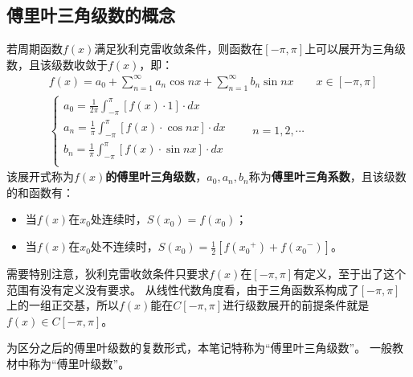 \subsection{傅里叶三角级数的概念}

\begin{definition}[傅里叶三角级数]
若周期函数$f\left( x \right) $满足狄利克雷收敛条件，则函数在$\left[ -\pi ,\pi \right] $上可以展开为三角级数，且该级数收敛于$f\left( x \right) $，即：
\begin{align*}
&f\left( x \right) =a_0+\sum_{n=1}^{\infty}{a_n\cos nx}+\sum_{n=1}^{\infty}{b_n\sin nx} \qquad x\in \left[ -\pi ,\pi \right]\\
&\begin{cases}
	a_0=\frac{1}{2\pi}\int_{-\pi}^{\pi}{\left[ f\left( x \right) \cdot 1 \right] \cdot dx}\\
	a_n=\frac{1}{\pi}\int_{-\pi}^{\pi}{\left[ f\left( x \right) \cdot \cos nx \right] \cdot dx}\\
	b_n=\frac{1}{\pi}\int_{-\pi}^{\pi}{\left[ f\left( x \right) \cdot \sin nx \right] \cdot dx}\\
\end{cases} \qquad n=1,2,\cdots
\end{align*}
该展开式称为{\bf $f\left( x \right) $的傅里叶三角级数}，$a_0,a_n,b_n$称为{\bf 傅里叶三角系数}，且该级数的和函数有：
\begin{itemize}
    \item 当$f\left( x \right) $在$x_0$处连续时，$S\left( x_0 \right) =f\left( x_0 \right) $；
    \item 当$f\left( x \right) $在$x_0$处不连续时，$S\left( x_0 \right) =\frac{1}{2}\left[ f\left( {x_0}^+ \right) +f\left( {x_0}^- \right) \right] $。
\end{itemize}
\end{definition}

需要特别注意，狄利克雷收敛条件只要求$f\left( x \right) $在$\left[ -\pi ,\pi \right] $有定义，至于出了这个范围有没有定义没有要求。
从线性代数角度看，由于三角函数系构成了$\left[ -\pi ,\pi \right] $上的一组正交基，所以$f\left( x \right) $能在$C\left[ -\pi ,\pi \right] $进行级数展开的前提条件就是$f\left( x \right) \in C\left[ -\pi ,\pi \right] $。

\begin{tcolorbox}
为区分之后的傅里叶级数的复数形式，本笔记特称为“傅里叶三角级数”。
一般教材中称为“傅里叶级数”。
\end{tcolorbox}

